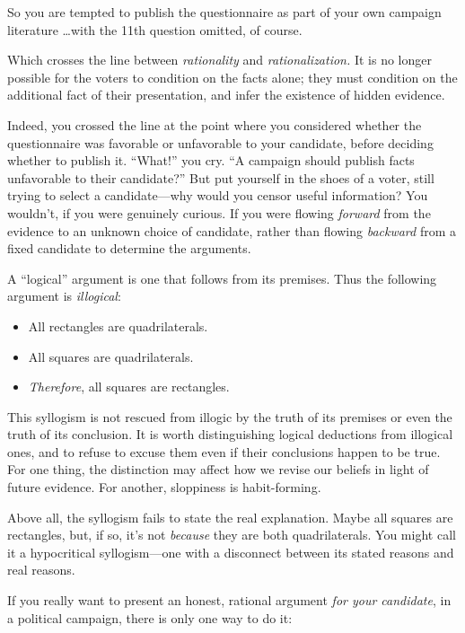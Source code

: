 {
 So you are tempted to publish the questionnaire as part of your
own campaign literature \ldots with the 11th question omitted, of
course.}

{
 Which crosses the line between \textit{rationality} and
\textit{rationalization.} It is no longer possible for the voters to
condition on the facts alone; they must condition on the additional
fact of their presentation, and infer the existence of hidden
evidence.}

{
 Indeed, you crossed the line at the point where you considered
whether the questionnaire was favorable or unfavorable to your
candidate, before deciding whether to publish it.
``What!'' you cry.
``A campaign should publish facts unfavorable to their
candidate?'' But put yourself in the shoes of a
voter, still trying to select a candidate---why would you censor useful
information? You wouldn't, if you were genuinely
curious. If you were flowing \textit{forward} from the evidence to an
unknown choice of candidate, rather than flowing \textit{backward} from
a fixed candidate to determine the arguments.}

{
 A ``logical'' argument is one
that follows from its premises. Thus the following argument is
\textit{illogical}:}

\begin{itemize}
\item  All rectangles are quadrilaterals.
\item  All squares are quadrilaterals.
\item  \textit{Therefore}, all squares are rectangles.
\end{itemize}

{
 This syllogism is not rescued from illogic by the truth of its
premises or even the truth of its conclusion. It is worth
distinguishing logical deductions from illogical ones, and to refuse to
excuse them even if their conclusions happen to be true. For one thing,
the distinction may affect how we revise our beliefs in light of future
evidence. For another, sloppiness is habit-forming.}

{
 Above all, the syllogism fails to state the real explanation.
Maybe all squares are rectangles, but, if so, it's not
\textit{because} they are both quadrilaterals. You might call it a
hypocritical syllogism---one with a disconnect between its stated
reasons and real reasons.}

{
 If you really want to present an honest, rational argument
\textit{for your candidate}, in a political campaign, there is only one
way to do it:}

